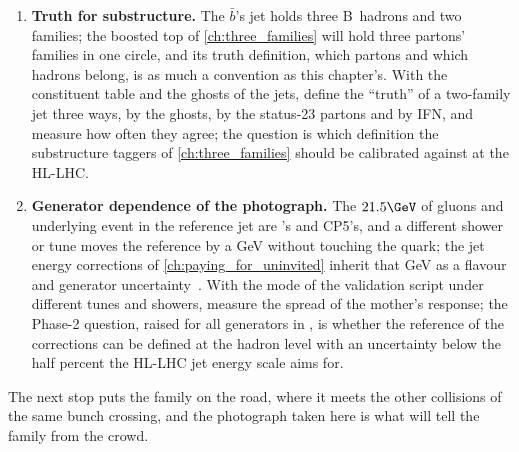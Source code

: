 \begin{enumerate}
    $0.8$ for our family and the underlying event adds a GeV per tenth
    of a unit; at the HL-LHC the pileup of \cref{ch:crowd_on_the_road}
    adds $0.9\GeV$ per unit of area per collision at the generator level,
    $0.6$ after the detector, before subtraction.
    With the profile of the ensemble and the pileup density of
    \cref{ch:paying_for_uninvited}, find the radius at which the
    family's own radiation lost outside equals the pileup fluctuation
    inside, as a function of the jet \pt; the question, raised for Run~2
    in \cite{CMS:2016lmd} and open for Phase~2, is whether $0.4$ is still
    the right photograph for a $100\GeV$ $b$ jet at $\langle\mu\rangle=200$.
  \item \textbf{Truth for substructure.} The $\bar b$'s \akeight jet
    holds three B~hadrons and two families; the boosted top of
    \cref{ch:three_families} will hold three partons' families in one
    circle, and its truth definition, which partons and which hadrons
    belong, is as much a convention as this chapter's. With the
    constituent table and the ghosts of the \akeight jets, define the
    ``truth'' of a two-family jet three ways, by the ghosts, by the
    status-23 partons and by IFN, and measure how often they agree; the
    question is which definition the substructure taggers of
    \cref{ch:three_families} should be calibrated against at the HL-LHC.
  \item \textbf{Generator dependence of the photograph.} The $21.5\GeV$
    of gluons and underlying event in the reference jet are \PYTHIA's
    and CP5's, and a different shower or tune moves the reference by a
    GeV without touching the quark; the jet energy corrections of
    \cref{ch:paying_for_uninvited} inherit that GeV as a flavour and
    generator uncertainty~\cite{CMS:2016lmd}. With the  mode of
    the validation script under different tunes and showers, measure the
    spread of the mother's \akfournonu response; the Phase-2 question,
    raised for all generators in \cite{HSFPhysicsEventGeneratorWG:2020gxw},
    is whether the reference of the corrections can be defined at the
    hadron level with an uncertainty below the half percent the HL-LHC
    jet energy scale aims for.
\end{enumerate}
The next stop puts the family on the road, where it meets the other
collisions of the same bunch crossing, and the photograph taken here is
what will tell the family from the crowd.
